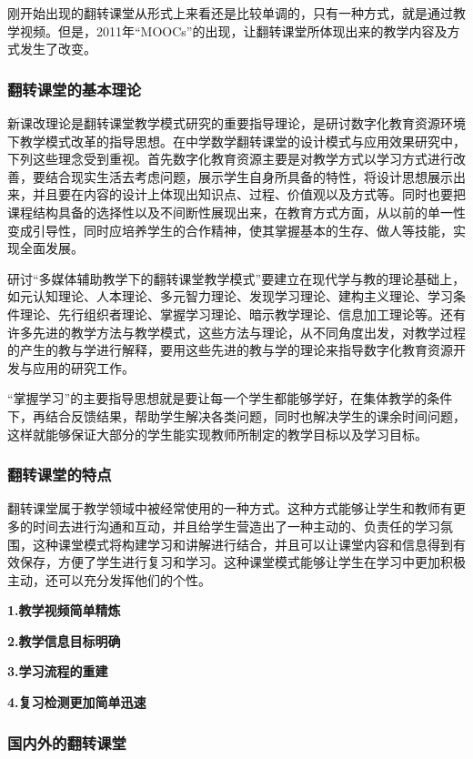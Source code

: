 \documentclass{article}
\begin{document}
刚开始出现的翻转课堂从形式上来看还是比较单调的，只有一种方式，就是通过教学视频。但是，2011年“MOOCs”的出现，让翻转课堂所体现出来的教学内容及方式发生了改变。

\subsubsection{翻转课堂的基本理论}

新课改理论是翻转课堂教学模式研究的重要指导理论，是研讨数字化教育资源环境下教学模式改革的指导思想。在中学数学翻转课堂的设计模式与应用效果研究中，下列这些理念受到重视。首先数字化教育资源主要是对教学方式以学习方式进行改善，要结合现实生活去考虑问题，展示学生自身所具备的特性，将设计思想展示出来，并且要在内容的设计上体现出知识点、过程、价值观以及方式等。同时也要把课程结构具备的选择性以及不间断性展现出来，在教育方式方面，从以前的单一性变成引导性，同时应培养学生的合作精神，使其掌握基本的生存、做人等技能，实现全面发展。

研讨“多媒体辅助教学下的翻转课堂教学模式”要建立在现代学与教的理论基础上，如元认知理论、人本理论、多元智力理论、发现学习理论、建构主义理论、学习条件理论、先行组织者理论、掌握学习理论、暗示教学理论、信息加工理论等。还有许多先进的教学方法与教学模式，这些方法与理论，从不同角度出发，对教学过程的产生的教与学进行解释，要用这些先进的教与学的理论来指导数字化教育资源开发与应用的研究工作。

“掌握学习”的主要指导思想就是要让每一个学生都能够学好，在集体教学的条件下，再结合反馈结果，帮助学生解决各类问题，同时也解决学生的课余时间问题，这样就能够保证大部分的学生能实现教师所制定的教学目标以及学习目标。

\subsubsection{翻转课堂的特点}

翻转课堂属于教学领域中被经常使用的一种方式。这种方式能够让学生和教师有更多的时间去进行沟通和互动，并且给学生营造出了一种主动的、负责任的学习氛围，这种课堂模式将构建学习和讲解进行结合，并且可以让课堂内容和信息得到有效保存，方便了学生进行复习和学习。这种课堂模式能够让学生在学习中更加积极主动，还可以充分发挥他们的个性。

\textbf{1.教学视频简单精炼}

\textbf{2.教学信息目标明确}

\textbf{3.学习流程的重建}

\textbf{4.复习检测更加简单迅速}


\subsubsection{国内外的翻转课堂}
\end{document}
